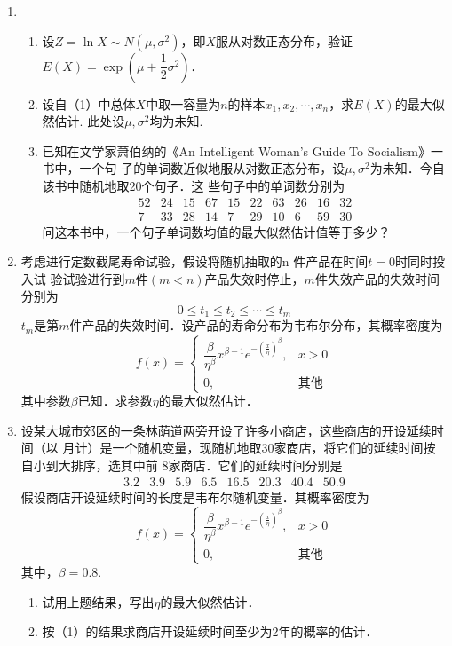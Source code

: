 \documentclass[10pt,a4paper]{article}
\begin{document}
\begin{enumerate}
    \item \begin{enumerate}
        \item 设$Z=\ln X\sim N(\mu,\sigma^2)$，即$X$服从对数正态分布，验证$E(X)=\exp (\mu+\dfrac{1}{2}\sigma^2)$．
        \item 设自（1）中总体$X$中取一容量为$n$的样本$x_1,x_2,\cdots,x_n$，求$E(X)$的最大似然估计.
        此处设$\mu,\sigma^2$均为未知.
        \item 已知在文学家萧伯纳的《An Intelligent Woman's Guide To Socialism》一书中，一个句
        子的单词数近似地服从对数正态分布，设$\mu,\sigma^2$为未知．今自该书中随机地取20个句子．这
        些句子中的单词数分别为
        $$\begin{array}{cccccccccc}
            52 & 24 & 15 & 67 & 15 & 22 & 63 & 26 & 16 & 32\\
            7 & 33 & 28 & 14 & 7 & 29 & 10 & 6 & 59 & 30 
        \end{array}$$
        问这本书中，一个句子单词数均值的最大似然估计值等于多少？
    \end{enumerate}






    \item 考虑进行定数截尾寿命试验，假设将随机抽取的n 件产品在时间$t=0$时同时投入试
    验试验进行到$m$件$(m<n)$产品失效时停止，$m$件失效产品的失效时间分别为
    $$0\leq t_1 \leq t_2 \leq \cdots \leq t_m$$
    $t_m$是第$m$件产品的失效时间．设产品的寿命分布为韦布尔分布，其概率密度为
    $$f(x)=\left\{\begin{array}{ll}
        \dfrac{\beta}{\eta ^\beta}x^{\beta-1}e^{{-(\frac{x}{\eta})}^\beta}, & x>0\\
        0, & \mbox{其他}
    \end{array}\right.$$
    其中参数$\beta$已知．求参数$\eta$的最大似然估计．





    \item 设某大城市郊区的一条林荫道两旁开设了许多小商店，这些商店的开设延续时间（以
    月计）是一个随机变量，现随机地取30家商店，将它们的延续时间按自小到大排序，选其中前
    8家商店．它们的延续时间分别是
    $$\begin{array}{cccccccc}
        3.2 & 3.9 & 5.9 & 6.5 & 16.5 & 20.3 & 40.4 & 50.9
    \end{array}$$
    假设商店开设延续时间的长度是韦布尔随机变量．其概率密度为
    $$f(x)=\left\{\begin{array}{ll}
        \dfrac{\beta}{\eta ^\beta}x^{\beta-1}e^{{-(\frac{x}{\eta})}^\beta}, & x>0\\
        0, & \mbox{其他}
    \end{array}\right.$$
    其中，$\beta=0.8$.
    \begin{enumerate}
        \item 试用上题结果，写出$\eta$的最大似然估计．
        \item 按（1）的结果求商店开设延续时间至少为2年的概率的估计．
    \end{enumerate}







\end{enumerate}
\end{document}
